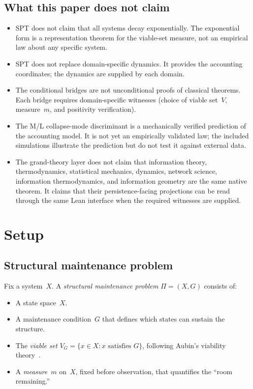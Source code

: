 \documentclass[11pt,a4paper]{article}
\begin{document}
\subsection{What this paper does not claim}

\begin{itemize}
\item SPT does not claim that all systems decay exponentially. The exponential form is a representation theorem for the viable-set measure, not an empirical law about any specific system.
\item SPT does not replace domain-specific dynamics. It provides the accounting coordinates; the dynamics are supplied by each domain.
\item The conditional bridges are not unconditional proofs of classical theorems. Each bridge requires domain-specific witnesses (choice of viable set~$V$, measure~$m$, and positivity verification).
\item The M/L collapse-mode discriminant is a mechanically verified prediction of the accounting model. It is not yet an empirically validated law; the included simulations illustrate the prediction but do not test it against external data.
\item The grand-theory layer does not claim that information theory, thermodynamics, statistical mechanics, dynamics, network science, information thermodynamics, and information geometry are the same native theorem. It claims that their persistence-facing projections can be read through the same Lean interface when the required witnesses are supplied.
\end{itemize}

\section{Setup}\label{sec:setup}

\subsection{Structural maintenance problem}

Fix a system~$X$. A \emph{structural maintenance problem} $\Pi = (X, G)$ consists of:
\begin{itemize}
\item A state space~$X$.
\item A maintenance condition~$G$ that defines which states can sustain the structure.
\item The \emph{viable set} $V_G = \{x \in X : x \text{ satisfies } G\}$, following Aubin's viability theory~\cite{aubin1991}.
\item A \emph{measure}~$m$ on~$X$, fixed before observation, that quantifies the ``room remaining.''
\end{itemize}
\end{document}
